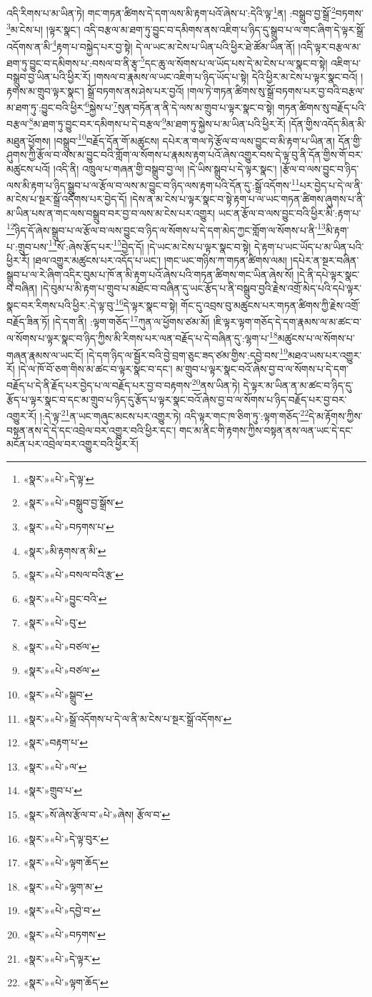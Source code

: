 འདི་རིགས་པ་མ་ཡིན་ཏེ། གང་གཏན་ཚིགས་དེ་དག་ལས་མི་རྟག་པའོ་ཞེས་པ་:དེའི་ལྟ་\footnote{«སྣར་»«པེ་»དེ་ལྟ་}ན། :བསྒྲུབ་བྱ་སྒྲོ་\footnote{«སྣར་»«པེ་»བསྒྲུབ་བྱ་སྒྲོས་}བཏགས་\footnote{«སྣར་»«པེ་»བཏགས་པ་}མ་ངེས་པ། །ལྟར་སྣང་། འདི་བརྩལ་མ་ཐག་ཏུ་བྱུང་བ་དམིགས་ནས་འཇིག་པ་ཉིད་དུ་སྒྲུབ་པ་ལ་གང་ཞིག་དེ་ལྟར་སྒྲོ་འདོགས་ན་མི་\footnote{«སྣར་»མི་རྟགས་ན་མི་}རྟག་པ་བསྐྱེད་པར་བྱ་སྟེ། དེ་ལ་ཡང་མ་ངེས་པ་ཡིན་པའི་ཕྱིར་ཐེ་ཚོམ་ཡིན་ནོ། །འདི་ལྟར་བརྩལ་མ་ཐག་ཏུ་བྱུང་བ་དམིགས་པ་:བསལ་བ་ནི་རྩྭ་\footnote{«སྣར་»«པེ་»བསལ་བའི་རྩ་}དང་ཆུ་ལ་སོགས་པ་ལ་ཡོད་པས་དེ་མ་ངེས་པ་ལ་སྣང་བ་སྟེ། འཇིག་པ་བསྒྲུབ་བྱ་ཡིན་པའི་ཕྱིར་རོ། །གསལ་བ་རྣམས་ལ་ཡང་འཇིག་པ་ཉིད་ཡོད་པ་སྟེ། དེའི་ཕྱིར་མ་ངེས་པ་ལྟར་སྣང་བའོ། །རྟགས་མ་གྲུབ་ལྟར་སྣང་། སྒྲོ་བཏགས་ནས་ཤེས་པར་བྱའོ། །གལ་ཏེ་གཏན་ཚིགས་སུ་སྒྲོ་བཏགས་པར་བྱ་བའི་བརྩལ་མ་ཐག་ཏུ་:བྱུང་བའི་ཕྱིར་\footnote{«སྣར་»«པེ་»བྱུང་བའི་}སྐྱེས་པ་\footnote{«སྣར་»«པེ་»བུ་}སུན་བཏོན་ན་ནི་དེ་ལས་མ་གྲུབ་པ་ལྟར་སྣང་བ་སྟེ། གཏན་ཚིགས་སུ་བརྗོད་པའི་བརྩལ་\footnote{«སྣར་»«པེ་»བཙལ་}མ་ཐག་ཏུ་བྱུང་བར་དམིགས་པ་དེ་བརྩལ་\footnote{«སྣར་»«པེ་»བཙལ་}མ་ཐག་ཏུ་སྐྱེས་པ་མ་ཡིན་པའི་ཕྱིར་རོ། །དོན་གྱིས་འདོད་མིན་མི་མཐུན་ཕྱོགས། །བསྒྲུབ་\footnote{«སྣར་»«པེ་»སྒྲུབ་}བརྗོད་དོན་གོ་མཚུངས། དཔེར་ན་གལ་ཏེ་རྩོལ་བ་ལས་བྱུང་བ་མི་རྟག་པ་ཡིན་ན། དོན་གྱི་ཤུགས་ཀྱི་རྩོལ་བ་ལས་མ་བྱུང་བའི་གློག་ལ་སོགས་པ་རྣམས་རྟག་པའོ་ཞེས་འགྱུར་བས་དེ་ལྟ་བུ་ནི་དོན་གྱིས་གོ་བར་མཚུངས་པའོ། །འདི་ནི། འཁྲུལ་པ་གཞན་གྱི་བསྒྲུབ་བྱ་ལ། །དེ་ཡིས་སྒྲུབ་པ་དེ་ལྟར་སྣང་། །རྩོལ་བ་ལས་བྱུང་བ་ཉིད་ལས་མི་རྟག་པ་ཉིད་སྒྲུབ་པ་ལ་རྩོལ་བ་ལས་མ་བྱུང་བ་ཉིད་ལས་རྟག་པའི་དོན་དུ་:སྒྲོ་འདོགས་\footnote{«སྣར་»«པེ་»སྒྲོ་འདོགས་པ་དེ་ལ་ནི་མ་ངེས་པ་སྔར་སྒྲོ་འདོགས་}པར་བྱེད་པ་དེ་ལ་ནི་མ་ངེས་པ་སྔར་སྒྲོ་འདོགས་པར་བྱེད་དོ། །དེས་ན་མ་ངེས་པ་ལྟར་སྣང་བ་སྟེ་རྟག་པ་ལ་ཡང་གཏན་ཚིགས་ཞུགས་པ་ནི་མ་ཡིན་པས་ན་གང་ལས་བསྒྲུབ་བར་བྱ་བ་ལས་མ་ངེས་པར་འགྱུར། ཡང་ན་རྩོལ་བ་ལས་བྱུང་བའི་ཕྱིར་མི་:རྟག་པ་\footnote{«སྣར་»བརྟག་པ་}ཉིད་དོ་ཞེས་སྒྲུབ་པ་ལ་རྩོལ་བ་ལས་བྱུང་བ་ཉིད་ལ་སོགས་པ་དེ་དག་མེད་ཀྱང་གློག་ལ་སོགས་པ་ནི་\footnote{«སྣར་»«པེ་»ལ་}མི་རྟག་པ་:གྲུབ་པས་\footnote{«སྣར་»གྲུབ་པ་}སོ་:ཞེས་རྩོད་པར་\footnote{«སྣར་»སོ་ཞེས་རྩོལ་བ་«པེ་»ཞེས། རྩོལ་བ་}བྱེད་དོ། །དེ་ཡང་མ་ངེས་པ་ལྟར་སྣང་བ་སྟེ། དེ་རྟག་པ་ཡང་ཡོད་པ་མ་ཡིན་པའི་ཕྱིར་རོ། །ཐལ་འགྱུར་མཚུངས་པར་འདོད་པ་ཡང་། །གང་ཡང་གཉིས་ཀ་གཏན་ཚིགས་ལམ། །དཔེར་ན་སྔར་བཞིན་སྒྲུབ་པ་ལ་རེ་ཞིག་འདིར་བུམ་པ་ཁོ་ན་མི་རྟག་པའོ་ཞེས་པའི་གཏན་ཚིགས་གང་ཡིན་ཞེས་སོ། །དེ་ནི་དཔེ་ལྟར་སྣང་བ་བཞིན། །དེ་བུམ་པ་མི་རྟག་པ་གྲུབ་པ་མཐོང་བ་བཞིན་དུ་ཡང་རྩོད་པ་ནི་བསྒྲུབ་བྱའི་རྗེས་འགྲོ་མེད་པའི་དཔེ་ལྟར་སྣང་བར་རིགས་པའི་ཕྱིར་:དེ་ལྟ་བུ་\footnote{«སྣར་»«པེ་»དེ་ལྟ་བུར་}དེ་ལྟར་སྣང་བ་སྟེ། གོང་དུ་འབྲས་བུ་མཚུངས་པར་གཏན་ཚིགས་ཀྱི་རྗེས་འགྲོ་བརྗོད་ཟིན་ཏོ། །དེ་དག་ནི། :ལྟག་གཅོད་\footnote{«སྣར་»«པེ་»ལྟག་ཆོད་}ཀུན་ལ་ཕྱོགས་ཙམ་མོ། །ཇི་ལྟར་ལྟག་གཅོད་དེ་དག་རྣམས་ལ་མ་ཚང་བ་ལ་སོགས་པ་ལྟར་སྣང་བ་ཉིད་ཀྱིས་མི་རིགས་པར་ལན་བརྗོད་པ་དེ་བཞིན་དུ་:ལྷག་པ་\footnote{«སྣར་»«པེ་»ལྷག་མ་}མཚུངས་པ་ལ་སོགས་པ་གཞན་རྣམས་ལ་ཡང་ངོ། །དེ་དག་ཉིད་ལ་སྦྱོར་བའི་བྱེ་བྲག་ཅུང་ཟད་ཙམ་གྱིས་:དབྱེ་བས་\footnote{«སྣར་»«པེ་»དབྱེ་བ་}མཐའ་ཡས་པར་འགྱུར་རོ། །དེ་ལ་ཁོ་བོ་ཅག་གིས་མ་ཚང་བ་ལྟར་སྣང་བ་དང་། མ་གྲུབ་པ་ལྟར་སྣང་བའོ་ཞེས་བྱ་བ་ལ་སོགས་པ་དེ་དག་བརྗོད་པ་དེ་ནི་རྗོད་པར་བྱེད་པ་ལ་བརྗོད་པར་བྱ་བ་བརྟགས་\footnote{«སྣར་»«པེ་»བཏགས་}ནས་ཡིན་ཏེ། དེ་ལྟར་མ་ཡིན་ན་མ་ཚང་བ་ཉིད་དུ་རྩོད་པ་ལྟར་སྣང་བ་དང་མ་གྲུབ་པ་ཉིད་དུ་རྩོད་པ་ལྟར་སྣང་བའོ་ཞེས་བྱ་བ་ལ་སོགས་པ་ཉིད་བརྗོད་པར་བྱ་བར་འགྱུར་རོ། །:དེ་ལྟ་\footnote{«སྣར་»«པེ་»དེ་ལྟར་}ན་ཡང་གཞུང་མངས་པར་འགྱུར་ཏེ། འདི་ལྟར་གང་ཁ་ཅིག་ཏུ་:ལྟག་གཅོད་\footnote{«སྣར་»«པེ་»ལྟག་ཆོད་}དེ་མ་རྟོགས་ཀྱིས་བསྟན་ནས་དེ་དེ་དང་འབྲེལ་བར་འགྱུར་བའི་ཕྱིར་དང་། གང་མ་ནིང་གི་རྟགས་ཀྱིས་བསྟན་ནས་ལན་ཡང་དེ་དང་མངོན་པར་འབྲེལ་བར་འགྱུར་བའི་ཕྱིར་རོ། 